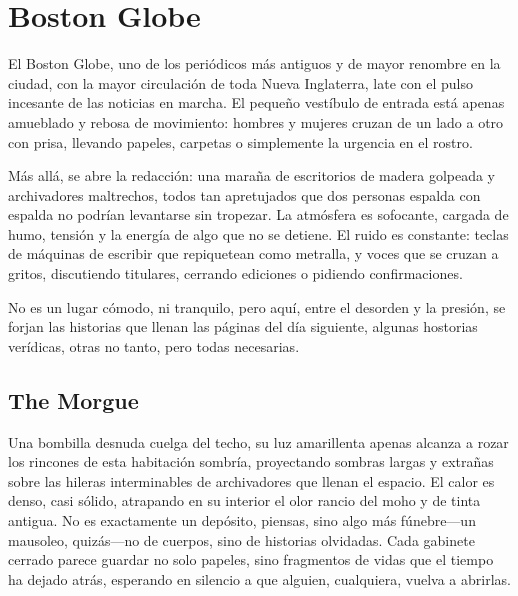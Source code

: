 \section{Boston Globe} 

El Boston Globe, uno de los periódicos más antiguos y de mayor renombre en la
ciudad, con la mayor circulación de toda Nueva Inglaterra, late con el pulso
incesante de las noticias en marcha. El pequeño vestíbulo de entrada está
apenas amueblado y rebosa de movimiento: hombres y mujeres cruzan de un lado a
otro con prisa, llevando papeles, carpetas o simplemente la urgencia en el
rostro.

Más allá, se abre la redacción: una maraña de escritorios de madera golpeada y
archivadores maltrechos, todos tan apretujados que dos personas espalda con
espalda no podrían levantarse sin tropezar. La atmósfera es sofocante, cargada
de humo, tensión y la energía de algo que no se detiene. El ruido es constante:
teclas de máquinas de escribir que repiquetean como metralla, y voces que se
cruzan a gritos, discutiendo titulares, cerrando ediciones o pidiendo
confirmaciones.

No es un lugar cómodo, ni tranquilo, pero aquí, entre el desorden y la presión,
se forjan las historias que llenan las páginas del día siguiente, algunas
hostorias verídicas, otras no tanto, pero todas necesarias.

\subsection{The Morgue}

Una bombilla desnuda cuelga del techo, su luz amarillenta apenas alcanza a
rozar los rincones de esta habitación sombría, proyectando sombras largas y
extrañas sobre las hileras interminables de archivadores que llenan el espacio.
El calor es denso, casi sólido, atrapando en su interior el olor rancio del
moho y de tinta antigua. No es exactamente un depósito, piensas, sino algo más
fúnebre—un mausoleo, quizás—no de cuerpos, sino de historias olvidadas. Cada
gabinete cerrado parece guardar no solo papeles, sino fragmentos de vidas que
el tiempo ha dejado atrás, esperando en silencio a que alguien, cualquiera,
vuelva a abrirlas.
